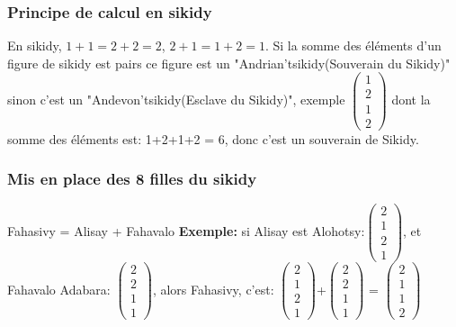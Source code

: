 \documentclass[12pt]{report}
\begin{document}
\subsubsection{Principe de calcul en sikidy}

En sikidy, $1+1 = 2+2 = 2$, $2+1 = 1+2 = 1$. Si la somme des éléments d'un figure de sikidy est pairs ce figure est un "Andrian'tsikidy(Souverain du Sikidy)" sinon c'est un "Andevon'tsikidy(Esclave du Sikidy)", exemple $ \begin{pmatrix}
1 \\
2 \\
1 \\
2
\end{pmatrix} $ dont la somme des éléments est: 1+2+1+2 = 6, donc c'est un souverain de Sikidy.

\subsubsection{Mis en place des 8 filles du sikidy}

Fahasivy = Alisay + Fahavalo\newline
\textbf{Exemple:} si Alisay est Alohotsy:$ \begin{pmatrix}
2\\
1\\
2\\
1
\end{pmatrix} $, et Fahavalo Adabara: $ \begin{pmatrix}
2\\
2\\
1\\
1
\end{pmatrix} $, alors Fahasivy, c'est: $ \begin{pmatrix}
2\\
1\\
2\\
1
\end{pmatrix} $+$ \begin{pmatrix}
2\\
2\\
1\\
1
\end{pmatrix} $ = $ \begin{pmatrix}
2\\
1\\
1\\
2
\end{pmatrix} $ \newline \newline \newline \newline
\end{document}
